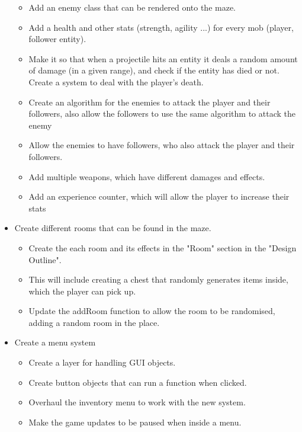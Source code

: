 \documentclass{article}
\begin{document}
\begin{itemize}
\begin{itemize}
                        \item Add an enemy class that can be rendered onto the maze.
                        \item Add a health and other stats (strength, agility ...) for every mob (player, follower entity).
                        \item Make it so that when a projectile hits an entity it deals a random amount of damage (in a given range), and check if the entity has died or not. Create a system to deal with the player's death.
                        \item Create an algorithm for the enemies to attack the player and their followers, also allow the followers to use the same algorithm to attack the enemy
                        \item Allow the enemies to have followers, who also attack the player and their followers.
                        \item Add multiple weapons, which have different damages and effects.
                        \item Add an experience counter, which will allow the player to increase their stats
                    \end{itemize}
                \item Create different rooms that can be found in the maze.
                    \begin{itemize}
                        \item Create the each room and its effects in the "Room" section in the "Design Outline".
                        \item This will include creating a chest that randomly generates items inside, which the player can pick up.
                        \item Update the addRoom function to allow the room to be randomised, adding a random room in the place.
                    \end{itemize}
                \item Create a menu system
                    \begin{itemize}
                        \item Create a layer for handling GUI objects.
                        \item Create button objects that can run a function when clicked.
                        \item Overhaul the inventory menu to work with the new system.
                        \item Make the game updates to be paused when inside a menu.

\end{itemize}
\end{itemize}
\end{document}
